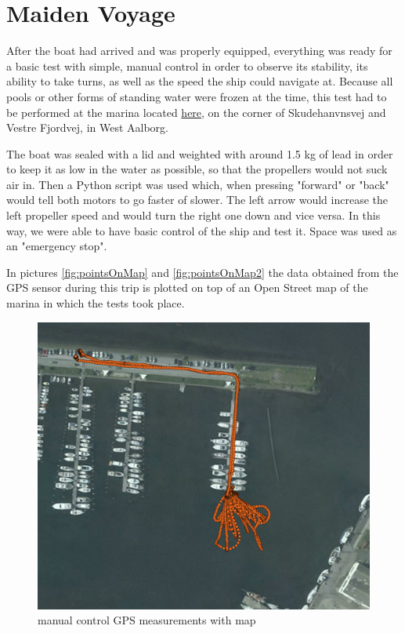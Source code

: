 \chapter{Maiden Voyage}

After the boat had arrived and was properly equipped, everything was ready for a basic test with simple, manual control in order to observe its stability, its ability to take turns, as well as the speed the ship could navigate at. Because all pools or other forms of standing water were frozen at the time, this test had to be performed at the marina located \href{https://maps.google.com/?ll=57.058301,9.896772&spn=0.003495,0.009645&t=h&z=17""}{here}, on the corner of Skudehanvnsvej and Vestre Fjordvej, in West Aalborg. 

The boat was sealed with a lid and weighted with around 1.5 kg of lead in order to keep it as low in the water as possible, so that the propellers would not suck air in. Then a Python script was used which, when pressing "forward" or "back" would tell both motors to go faster of slower. The left arrow would increase the left propeller speed and would turn the right one down and vice versa. In this way, we were able to have basic control of the ship and test it. Space was used as an "emergency stop".

In pictures \vref{fig:pointsOnMap} and \vref{fig:pointsOnMap2} the data obtained from the GPS sensor during this trip is plotted on top of an Open Street map of the marina in which the tests took place. 

\begin{figure}[htbp]
	\begin{center}
		\includegraphics[width=\textwidth]{img/maidenVoyage/pointsOnMap}
		\caption{manual control GPS measurements with map} 
		\label{fig:pointsOnMap}
	\end{center}
\end{figure}

